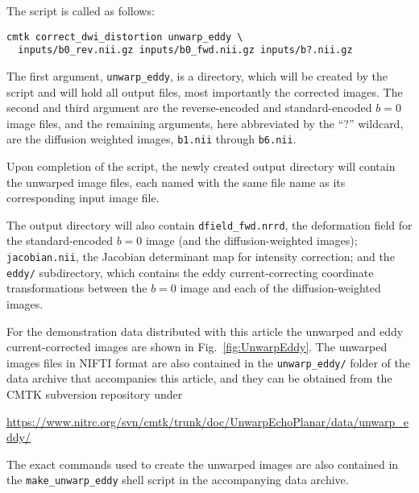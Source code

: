 \documentclass{InsightArticle}
\begin{document}
The script is called as follows:
\begin{verbatim}
cmtk correct_dwi_distortion unwarp_eddy \
  inputs/b0_rev.nii.gz inputs/b0_fwd.nii.gz inputs/b?.nii.gz
\end{verbatim}
The first argument, \verb|unwarp_eddy|, is a directory, which will be created
by the script and will hold all output files, most importantly the corrected
images. The second and third argument are the reverse-encoded and
standard-encoded $b=0$ image files, and the remaining arguments, here
abbreviated by the ``?'' wildcard, are the diffusion weighted images,
\verb|b1.nii| through \verb|b6.nii|.

Upon completion of the script, the newly created output directory will contain
the unwarped image files, each named with the same file name as its
corresponding input image file.

The output directory will also contain \verb|dfield_fwd.nrrd|, the deformation
field for the standard-encoded $b=0$ image (and the diffusion-weighted
images); \verb|jacobian.nii|, the Jacobian determinant map for intensity
correction; and the \verb|eddy/| subdirectory, which contains the eddy
current-correcting coordinate transformations between the $b=0$ image and each
of the diffusion-weighted images.

For the demonstration data distributed with this article the unwarped and eddy
current-corrected images are shown in Fig.~\ref{fig:UnwarpEddy}. The unwarped
images files in NIFTI format are also contained in the \verb|unwarp_eddy/| folder
of the data archive that accompanies this article, and they can be obtained
from the CMTK subversion repository under

\centerline{\url{https://www.nitrc.org/svn/cmtk/trunk/doc/UnwarpEchoPlanar/data/unwarp_eddy/}}

The exact commands used to create the unwarped images are also contained in
the \verb|make_unwarp_eddy| shell script in the accompanying data archive.
\end{document}
